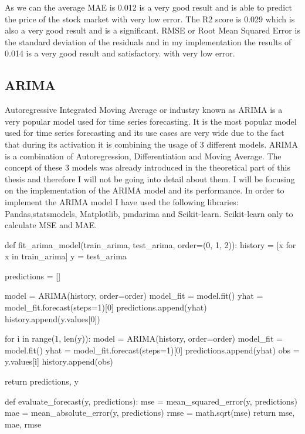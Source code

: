 \documentclass{imc-inf}
\begin{document}
	
	
	As we can the average MAE is 0.012 is a very good result and is able to predict the price of the stock market with very low error. The R2 score is 0.029 which is also a very good result and is a significant.
	RMSE or Root Mean Squared Error is the standard deviation of the residuals and in my implementation the results of  0.014 is a very good result and satisfactory.
	with very low error.
	\subsection{ARIMA}
	Autoregressive Integrated Moving Average or industry known as ARIMA is a very popular model used for time series forecasting. It is the most popular model used for time series forecasting and its use cases are very wide due 
	to the fact that during its activation it is combining the usage of 3 different models. ARIMA is a combination of Autoregression, Differentiation and Moving Average. The concept of these 3 models was already 
	introduced in the theoretical part of this thesis and therefore I will not be going into detail about them. I will be focusing on the implementation of the ARIMA model and its performance.
	In order to implement the ARIMA model I have used the following libraries: Pandas,statsmodels, Matplotlib, pmdarima and Scikit-learn. Scikit-learn only to calculate MSE and MAE.
	\begin{code}[language=Python, caption={ARIMA Model Building}]
		def fit_arima_model(train_arima, test_arima, order=(0, 1, 2)):
			history = [x for x in train_arima]
			y = test_arima
			
			predictions = []
			
			model = ARIMA(history, order=order)
			model_fit = model.fit()
			yhat = model_fit.forecast(steps=1)[0]
			predictions.append(yhat)
			history.append(y.values[0])
			
			for i in range(1, len(y)):
			model = ARIMA(history, order=order)
			model_fit = model.fit()
			yhat = model_fit.forecast(steps=1)[0]
			predictions.append(yhat)
			obs = y.values[i]
			history.append(obs)
			
			return predictions, y
			
			def evaluate_forecast(y, predictions):
			mse = mean_squared_error(y, predictions)
			mae = mean_absolute_error(y, predictions)
			rmse = math.sqrt(mse)
			return mse, mae, rmse
	\end{code}
	
\end{document}

